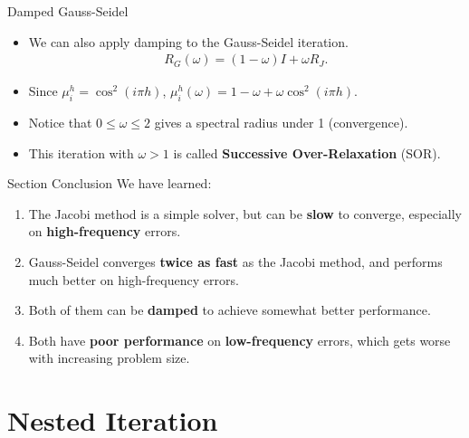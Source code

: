 \documentclass{beamer}
\begin{document}
\begin{frame}{Damped Gauss-Seidel}
 \begin{itemize}
  \item We can also apply damping to the Gauss-Seidel iteration.
  \begin{align}
   R_G(\omega) = (1-\omega)I + \omega R_J.
  \end{align}
  \item Since $\mu_i^h = \cos^2(i\pi h)$, $\mu_i^h(\omega) = 1 - \omega + \omega \cos^2(i\pi h)$.
  \item Notice that $0 \leq \omega \leq 2$ gives a spectral radius under 1 (convergence).
  \item This iteration with $\omega > 1$ is called
        \textbf{Successive Over-Relaxation} (SOR).
 \end{itemize}
\end{frame}

\begin{frame}{Section Conclusion}
 We have learned:
 \begin{enumerate}
  \item The Jacobi method is a simple solver, but can be \textbf{slow} to converge,
        especially on \textbf{high-frequency} errors.
  \item Gauss-Seidel converges \textbf{twice as fast} as the Jacobi method, and
        performs much better on high-frequency errors.
  \item Both of them can be \textbf{damped} to achieve somewhat better performance.
  \item Both have \textbf{poor performance} on \textbf{low-frequency} errors, which gets
        worse with increasing problem size.
 \end{enumerate}
\end{frame}

\section{Nested Iteration}%
\end{document}
